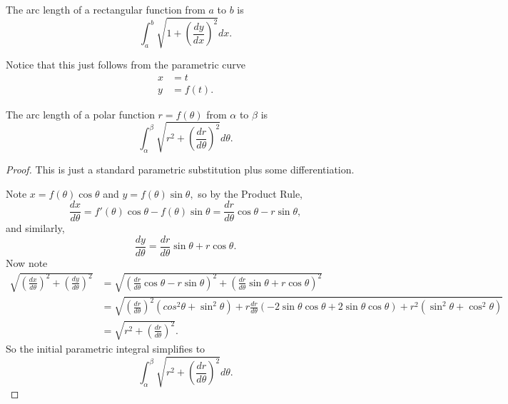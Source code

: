 \documentclass{article}
\begin{document}
\begin{center}
\end{center}

\begin{theo}
The arc length of a rectangular function from $a$ to $b$ is
\[\int_a^b \sqrt{1+\left(\frac{dy}{dx}\right)^2}dx.\]
\end{theo}

Notice that this just follows from the parametric curve
\begin{align*}
x&=t \\
y&=f(t).
\end{align*}

\begin{theo}
The arc length of a polar function $r=f(\theta)$ from $\alpha$ to $\beta$ is
\[\int_{\alpha}^{\beta}\sqrt{r^2+\left(\frac{dr}{d\theta}\right)^2}d\theta.\]
\end{theo}

\begin{proof}
This is just a standard parametric substitution plus some differentiation.

Note $x=f(\theta)\cos\theta$ and $y=f(\theta)\sin\theta,$ so by the Product Rule,
\[\frac{dx}{d\theta}=f'(\theta)\cos\theta-f(\theta)\sin\theta=\frac{dr}{d\theta}\cos\theta-r\sin\theta,\]
and similarly,
\[\frac{dy}{d\theta}=\frac{dr}{d\theta}\sin\theta+r\cos\theta.\]
Now note
\begin{align*}
\sqrt{\left(\frac{dx}{d\theta}\right)^2+\left(\frac{dy}{d\theta}\right)^2}&=\sqrt{\left(\frac{dr}{d\theta}\cos\theta-r\sin\theta\right)^2+\left(\frac{dr}{d\theta}\sin\theta+r\cos\theta\right)^2} \\
&=\sqrt{\left(\frac{dr}{d\theta}\right)^2(cos^2\theta+\sin^2\theta)+r\frac{dr}{d\theta}(-2\sin\theta\cos\theta+2\sin\theta\cos\theta)+r^2(\sin^2\theta+\cos^2\theta)} \\
&=\sqrt{r^2+\left(\frac{dr}{d\theta}\right)^2}.
\end{align*}
So the initial parametric integral simplifies to
\[\int_{\alpha}^{\beta}\sqrt{r^2+\left(\frac{dr}{d\theta}\right)^2}d\theta.\]
\end{proof}
\end{document}
